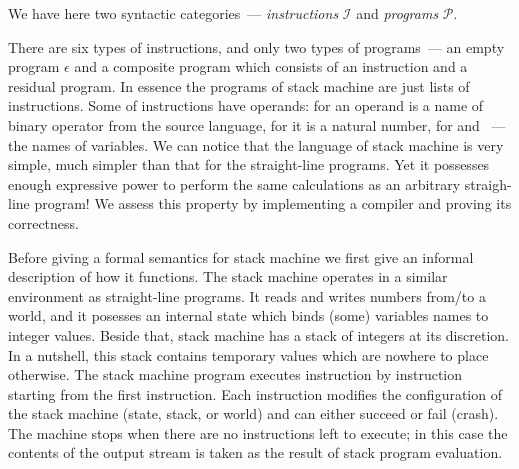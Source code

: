 We have here two syntactic categories~--- \emph{instructions} $\mathscr{I}$ and \emph{programs} $\mathscr{P}$.

There are six types of instructions, and only two types of programs~--- an empty program $\epsilon$ and a composite
program which consists of an instruction and a residual program. In essence the programs of stack machine
are just lists of instructions. Some of instructions have operands: for  an operand is a name of binary operator
from the source language, for  it is a natural number, for  and ~--- the names of
variables. We can notice that the language of stack machine is very simple, much simpler than that for the straight-line programs. Yet it
possesses enough expressive power to perform the same calculations as an arbitrary straigh-line program! We assess this property
by implementing a compiler and proving its correctness.

Before giving a formal semantics for stack machine we first give an informal description of how it functions. The stack
machine operates in a similar environment as straight-line programs. It reads and writes numbers from/to a world, and it
posesses an internal state which binds (some) variables names to integer values. Beside that, stack machine has a
stack of integers at its discretion. In a nutshell, this stack contains temporary values which are nowhere to place
otherwise. The stack machine program executes instruction by instruction starting from the first instruction.
Each instruction modifies the configuration of the stack machine (state, stack, or world) and can either succeed or
fail (crash). The machine stops when there are no instructions left to execute; in this case the contents of
the output stream is taken as the result of stack program evaluation.

